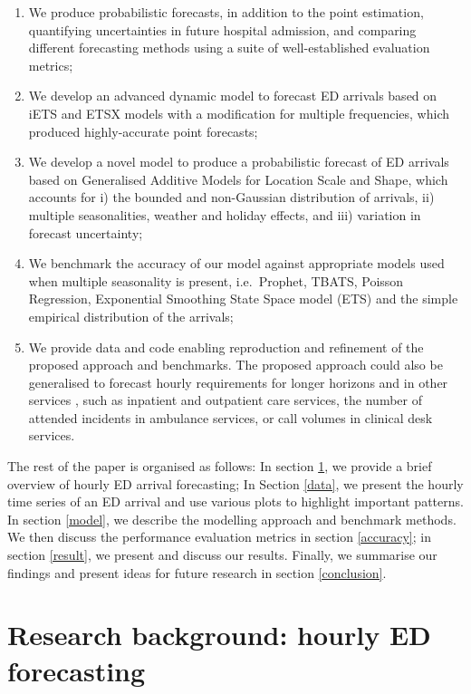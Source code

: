 \documentclass[]{elsarticle} %
\begin{document}
\begin{enumerate}
\def\labelenumi{\arabic{enumi}.}
\item
  We produce probabilistic forecasts, in addition to the point estimation, quantifying uncertainties in future hospital admission, and comparing different forecasting methods using a suite of well-established evaluation metrics;
\item
  We develop an advanced dynamic model to forecast ED arrivals based on iETS \citep{Svetunkov2019a} and ETSX models with a modification for multiple frequencies, which produced highly-accurate point forecasts;
\item
  We develop a novel model to produce a probabilistic forecast of ED arrivals based on Generalised Additive Models for Location Scale and Shape, which accounts for i) the bounded and non-Gaussian distribution of arrivals, ii) multiple seasonalities, weather and holiday effects, and iii) variation in forecast uncertainty;
\item
  We benchmark the accuracy of our model against appropriate models used when multiple seasonality is present, i.e.~Prophet, TBATS, Poisson Regression, Exponential Smoothing State Space model (ETS) and the simple empirical distribution of the arrivals;
\item
  We provide data and code enabling reproduction and refinement of the proposed approach and benchmarks. The proposed approach could also be generalised to forecast hourly requirements for longer horizons and in other services \citep{al2021empirical}, such as inpatient and outpatient care services, the number of attended incidents in ambulance services, or call volumes in clinical desk services.
\end{enumerate}

The rest of the paper is organised as follows: In section \ref{lit}, we provide a brief overview of hourly ED arrival forecasting; In Section \ref{data}, we present the hourly time series of an ED arrival and use various plots to highlight important patterns. In section \ref{model}, we describe the modelling approach and benchmark methods. We then discuss the performance evaluation metrics in section \ref{accuracy}; in section \ref{result}, we present and discuss our results. Finally, we summarise our findings and present ideas for future research in section \ref{conclusion}.

\hypertarget{lit}{%
\section{Research background: hourly ED forecasting}\label{lit}}
\end{document}

